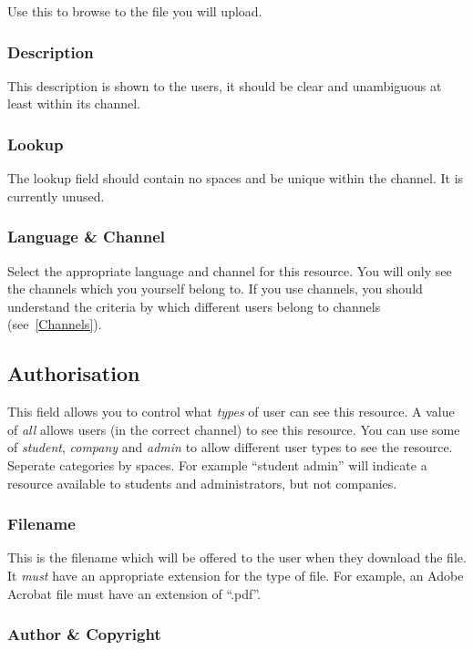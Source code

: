 \documentclass[12 pt]{book}
\begin{document}
Use this to browse to the file you will upload.

\subsubsection{Description}

This description is shown to the users, it should be clear and unambiguous at least within its channel.

\subsubsection{Lookup}

The lookup field should contain no spaces and be unique within the channel. It is currently unused.

\subsubsection{Language \& Channel}

Select the appropriate language and channel for this resource. You will only see the channels which you yourself belong to.
If you use channels, you should understand the criteria by which
different users belong to channels (see~\ref{Channels}).

\subsection{Authorisation}

This field allows you to control what \emph{types} of user can see this resource.
A value of \emph{all} allows users (in the correct channel) to see this resource.
You can use some of \emph{student}, \emph{company} and \emph{admin} to allow different
user types to see the resource. Seperate categories by spaces. For example
``student admin'' will indicate a resource available to students and
administrators, but not companies.

\subsubsection{Filename}

This is the filename which will be offered to the user when they download the file.
It \emph{must} have an appropriate extension for the type of file. For example,
an Adobe Acrobat file must have an extension of ``.pdf''.

\subsubsection{Author \& Copyright}
\end{document}
